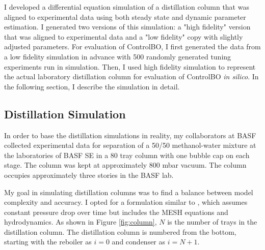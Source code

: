
I developed a differential equation simulation of a distillation column that was aligned to experimental data using both steady state and dynamic parameter estimation. I generated two versions of this simulation: a "high fidelity" version that was aligned to experimental data and a "low fidelity" copy with slightly adjusted parameters. For evaluation of ControlBO, I first generated the data from a low fidelity simulation in advance with 500 randomly generated tuning experiments run in simulation. Then, I used high fidelity simulation to represent the actual laboratory distillation column for evaluation of ControlBO \textit{in silico}. In the following section, I describe the simulation in detail.

\subsection{Distillation Simulation}\label{sec:distillation_model}

In order to base the distillation simulations in reality, my collaborators at BASF collected experimental data for separation of a 50/50 methanol-water mixture at the laboratories of BASF SE in a 80 tray column with one bubble cap on each stage. The column was kept at approximately 800 mbar vacuum. The column occupies approximately three stories in the BASF lab.  


My goal in simulating distillation columns was to find a balance between model complexity and accuracy. I opted for a formulation similar to \citet{Diehl2001}, which assumes constant pressure drop over time but includes the MESH equations and hydrodynamics. As shown in Figure \ref{fig:column}, $N$ is the number of trays in the distillation column. The distillation column is numbered from the bottom, starting with the reboiler as $i=0$ and condenser as $i=N+1$.  

